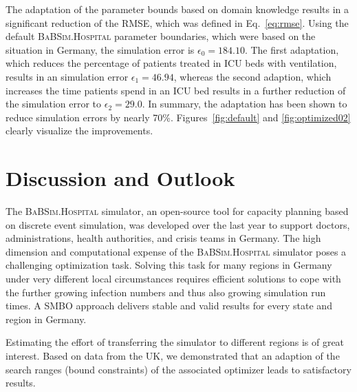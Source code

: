 \documentclass[conference]{IEEEtran}
\newcommand{\babsimhospital}{\textsc{BaBSim.Hospital}\xspace}
\begin{document}
The adaptation of the parameter bounds based on domain knowledge results in a significant reduction of the \gls{RMSE}, which was defined in  Eq.~\ref{eq:rmse}. 
Using the default \babsimhospital parameter boundaries, which were based on the situation in Germany, the simulation error is $\epsilon_0 = 184.10$.
The first adaptation, which reduces the percentage of patients treated in \gls{ICU} beds with ventilation, results in an simulation error $\epsilon_1 =  46.94$, whereas the second adaption, which increases the time patients spend in an \gls{ICU} bed results in a further reduction of the simulation error to $\epsilon_2 = 29.0$. In summary, the adaptation has been shown to reduce simulation errors by nearly 70\%.
Figures~\ref{fig:default} and \ref{fig:optimized02} clearly visualize the improvements.


\section{Discussion and Outlook}\label{sec:discussion}
The \babsimhospital simulator, an open-source tool for capacity planning based on discrete event simulation,  was developed over the last year to support doctors, administrations, health authorities, and crisis teams in Germany.
The high dimension and computational expense of the \babsimhospital simulator 
poses a challenging optimization task. 
Solving this task for many regions in Germany under very different local circumstances requires 
efficient solutions to cope with the further growing infection numbers and thus also growing simulation run times. 
A \gls{SMBO} approach delivers stable and valid results for every state and region in Germany.

Estimating the effort of transferring the simulator to different regions is of great interest. 
Based on data from the UK, we demonstrated that an adaption of the search ranges (bound constraints) of the associated optimizer leads to satisfactory results. 
\end{document}
